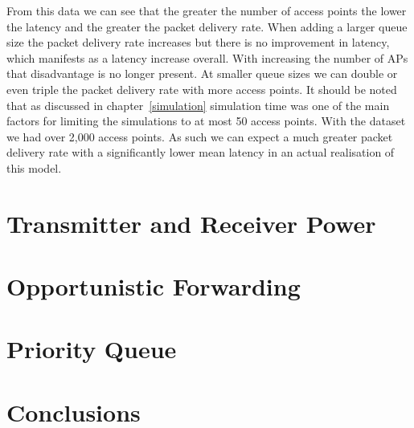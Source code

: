         From this data we can see that the greater the number of access points the lower the latency and the greater the packet delivery rate. When adding a larger queue size the packet delivery rate increases but there is no improvement in latency, which manifests as a latency increase overall. With increasing the number of APs that disadvantage is no longer present. At smaller queue sizes we can double or even triple the packet delivery rate with more access points. It should be noted that as discussed in chapter~\ref{simulation} simulation time was one of the main factors for limiting the simulations to at most 50 access points. With the dataset we had over 2,000 access points. As such we can expect a much greater packet delivery rate with a significantly lower mean latency in an actual realisation of this model. 



    \section{Transmitter and Receiver Power}\label{data_gathering_performance_transmitter_and_reciever_power}


    \section{Opportunistic Forwarding}\label{data_gathering_performance_opportunistic_forwarding}


    \section{Priority Queue}\label{data_gathering_performance_priority_queue}


    \section{Conclusions}\label{data_gathering_performance_conclusions}

